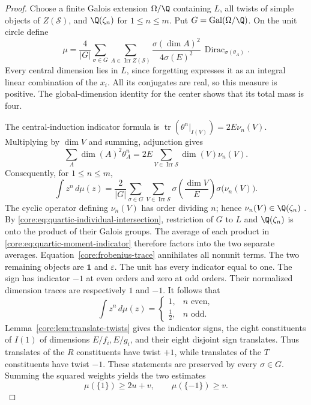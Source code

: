 \begin{proof}
Choose a finite Galois extension $\Omega/\Q$ containing $L$,
all twists of simple objects of $Z(\mathcal S)$, and
$\Q(\zeta_n)$ for $1\le n\le m$.  Put
$G=\operatorname{Gal}(\Omega/\Q)$.  On the unit circle define
\[
 \mu=\frac4{|G|}\sum_{\sigma\in G}
       \sum_{A\in\operatorname{Irr}Z(\mathcal S)}
       \frac{\sigma(\dim A)^2}{4\sigma(E)^2}\,
       \operatorname{Dirac}_{\sigma(\theta_A)}.
\]
Every central dimension lies in $L$, since forgetting expresses it as
an integral linear combination of the $x_i$.  All its conjugates are
real, so this measure is positive.  The global-dimension identity for
the center shows that its total mass is four.

The central-induction indicator formula \cite[Theorem~4.1]{NS} is
$\operatorname{tr}(\theta^n|_{I(V)})=2E\nu_n(V)$.
Multiplying by $\dim V$ and summing, adjunction gives
\[
 \sum_A\dim(A)^2\theta_A^n
 =2E\sum_{V\in\operatorname{Irr}\mathcal S}
                    \dim(V)\nu_n(V).
\]
Consequently, for $1\le n\le m$,
\begin{equation}\label{core:eq:quartic-moment-indicator}
 \int z^n\,d\mu(z)
 =\frac2{|G|}\sum_{\sigma\in G}
       \sum_{V\in\operatorname{Irr}\mathcal S}
       \sigma\!\left(\frac{\dim V}{E}\right)
       \sigma\bigl(\nu_n(V)\bigr).
\end{equation}
The cyclic operator defining $\nu_n(V)$ has order dividing $n$;
hence $\nu_n(V)\in\Q(\zeta_n)$
\cite[Theorem~5.1]{NSHigher}.  By
\eqref{core:eq:quartic-individual-intersection}, restriction of $G$ to
$L$ and $\Q(\zeta_n)$ is onto the product of their Galois
groups.  The average of each product in
\eqref{core:eq:quartic-moment-indicator} therefore factors into the two
separate averages.  Equation~\eqref{core:frobenius-trace}
annihilates all nonunit terms.  The two remaining objects are
$\mathbf1$ and $\varepsilon$.  The unit has every indicator equal to
one.  The sign has indicator $-1$ at even orders and zero at odd orders.
Their normalized dimension traces are respectively $1$ and $-1$.
It follows that
\begin{equation}\label{core:eq:quartic-constant-moments}
 \int z^n\,d\mu(z)=
 \begin{cases}1,&n\text{ even},\\[2pt]\tfrac12,&n\text{ odd}.
 \end{cases}
\end{equation}
Lemma~\ref{core:lem:translate-twists} gives the indicator signs,
the eight constituents of $I(1)$ of dimensions $E/f_i,E/g_i$,
and their eight disjoint sign translates.
Thus translates of the $R$ constituents have twist $+1$, while
translates of the $T$ constituents have twist $-1$.  These statements
are preserved by every $\sigma\in G$.  Summing the squared weights
yields the two estimates
\begin{equation}\label{core:eq:quartic-atom-bound}
 \mu(\{1\})\ge 2u+v,\qquad \mu(\{-1\})\ge v.
\end{equation}


\end{proof}
